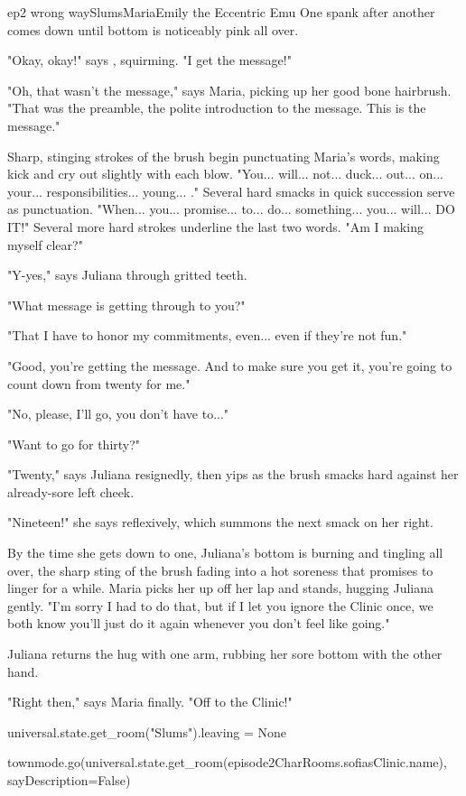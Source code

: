 \documentclass{book}
\begin{document}
\begin{node}{ep2 wrong way}{Slums}{Maria}{Emily the Eccentric Emu}
One spank after another comes down until \names{} bottom is noticeably pink all over. 

"Okay, okay!" says \name{}, squirming. "I get the message!"

"Oh, that wasn't the message," says Maria, picking up her good bone hairbrush. "That was the preamble, the polite introduction to the message. This is the message." 

Sharp, stinging strokes of the brush begin punctuating Maria's words, making \name{} kick and cry out slightly with each blow. "You... will... not... duck... out... on... your... responsibilities... young... \manlady{}." Several hard smacks in quick succession serve 
as punctuation. "When... you... promise... to... do... something... you... will... DO IT!" Several more hard strokes underline the last two words. "Am I making myself clear?"

"Y-yes," says Juliana through gritted teeth.

"What message is getting through to you?"

"That I have to honor my commitments, even... even if they're not fun."

"Good, you're getting the message. And to make sure you get it, you're going to count down from twenty for me."

"No, please, I'll go, you don't have to..."

"Want to go for thirty?"

"Twenty," says Juliana resignedly, then yips as the brush smacks hard against her already-sore left cheek. 

"Nineteen!" she says reflexively, which summons the next smack on her right.

By the time she gets down to one, Juliana's bottom is burning and tingling all over, the sharp sting of the brush fading into a hot soreness that promises to linger for a while. Maria picks her up off her lap and stands, hugging Juliana gently. "I'm sorry I had to do 
that, but if I let you ignore the Clinic once, we both know you'll just do it again whenever you don't feel like going."

Juliana returns the hug with one arm, rubbing her sore bottom with the other hand.

"Right then," says Maria finally. "Off to the Clinic!"

\begin{code}

    universal.state.get\_room("Slums").leaving = None

    townmode.go(universal.state.get\_room(episode2CharRooms.sofiasClinic.name), sayDescription=False)

\end{code}

\end{node}
\end{document}
